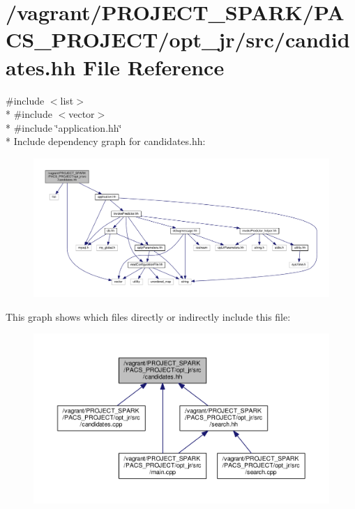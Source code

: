 \hypertarget{candidates_8hh}{\section{/vagrant/\-P\-R\-O\-J\-E\-C\-T\-\_\-\-S\-P\-A\-R\-K/\-P\-A\-C\-S\-\_\-\-P\-R\-O\-J\-E\-C\-T/opt\-\_\-jr/src/candidates.hh File Reference}
\label{candidates_8hh}
}
{\ttfamily \#include $<$list$>$}\\*
{\ttfamily \#include $<$vector$>$}\\*
{\ttfamily \#include \char`\"{}application.\-hh\char`\"{}}\\*
Include dependency graph for candidates.\-hh\-:
\nopagebreak
\begin{figure}[H]
\begin{center}
\leavevmode
\includegraphics[width=350pt]{candidates_8hh__incl}
\end{center}
\end{figure}
This graph shows which files directly or indirectly include this file\-:\nopagebreak
\begin{figure}[H]
\begin{center}
\leavevmode
\includegraphics[width=350pt]{candidates_8hh__dep__incl}
\end{center}
\end{figure}
